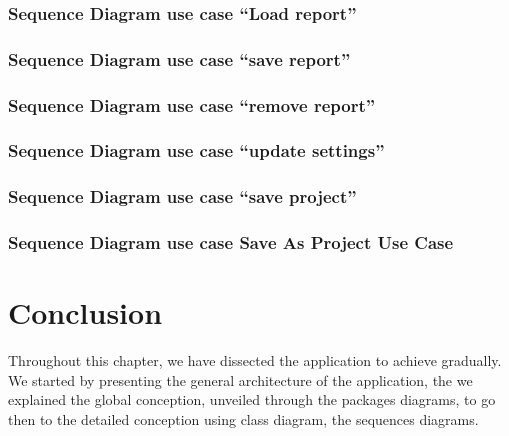	\subsubsection{Sequence Diagram use case ``Load report''}
	

	\clearpage
	\newpage
	\subsubsection{Sequence Diagram use case ``save report''}

	\clearpage
	\newpage 
	\subsubsection{Sequence Diagram use case ``remove report''}

	\clearpage
	\newpage
	
	\subsubsection{Sequence Diagram use case ``update settings''}

	\clearpage
	\newpage


	\clearpage
    \newpage 
	\subsubsection{Sequence Diagram use case ``save project''}	
	
	
    \pagebreak

	\clearpage
	\newpage
	\subsubsection{Sequence Diagram use case Save As Project Use Case}


    \pagebreak
	\clearpage
	\newpage
	\section{Conclusion}
	Throughout this chapter, we have dissected the application to achieve gradually.
	We started by presenting the general architecture of the application, the we explained the global conception, unveiled through the packages diagrams, to go then to the detailed conception using class diagram, the sequences diagrams.  
	
